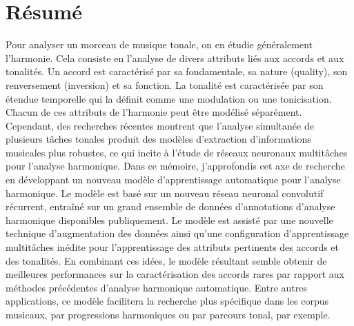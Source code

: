 \chapter*{R\'esum\'e}
\label{chap:abstract-fr}

Pour analyser un morceau de musique tonale, on en étudie
généralement l'harmonie. Cela consiste en l'analyse de
divers attributs liés aux accords et aux tonalités. Un
accord est caractérisé par sa fondamentale, sa nature
(quality), son renversement (inversion) et sa fonction. La
tonalité est caractérisée par son étendue temporelle qui la
définit comme une modulation ou une tonicisation. Chacun de
ces attributs de l'harmonie peut être modélisé séparément.
Cependant, des recherches récentes montrent que l'analyse
simultanée de plusieurs tâches tonales produit des modèles
d'extraction d'informations musicales plus robustes, ce qui
incite à l'étude de réseaux neuronaux multitâches pour
l'analyse harmonique. Dans ce mémoire, j'approfondis cet axe
de recherche en développant un nouveau modèle
d'apprentissage automatique pour l'analyse harmonique. Le
modèle est basé sur un nouveau réseau neuronal convolutif
récurrent, entraîné sur un grand ensemble de données
d'annotations d'analyse harmonique disponibles publiquement.
Le modèle est assisté par une nouvelle technique
d'augmentation des données ainsi qu'une configuration
d'apprentissage multitâches inédite pour l'apprentissage des
attributs pertinents des accords et des tonalités. En
combinant ces idées, le modèle résultant semble obtenir de
meilleures performances sur la caractérisation des accords
rares par rapport aux méthodes précédentes d'analyse
harmonique automatique. Entre autres applications, ce modèle
facilitera la recherche plus spécifique dans les corpus
musicaux, par progressions harmoniques ou par parcours
tonal, par exemple.


